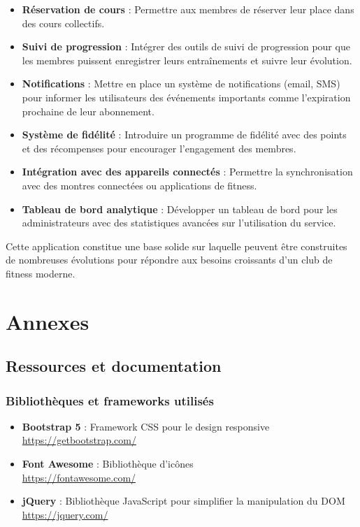 \documentclass[12pt,a4paper]{report}
\begin{document}
\begin{itemize}
    \item \textbf{Réservation de cours} : Permettre aux membres de réserver leur place dans des cours collectifs.
    
    \item \textbf{Suivi de progression} : Intégrer des outils de suivi de progression pour que les membres puissent enregistrer leurs entraînements et suivre leur évolution.
    
    \item \textbf{Notifications} : Mettre en place un système de notifications (email, SMS) pour informer les utilisateurs des événements importants comme l'expiration prochaine de leur abonnement.
    
    \item \textbf{Système de fidélité} : Introduire un programme de fidélité avec des points et des récompenses pour encourager l'engagement des membres.
    
    \item \textbf{Intégration avec des appareils connectés} : Permettre la synchronisation avec des montres connectées ou applications de fitness.
    
    \item \textbf{Tableau de bord analytique} : Développer un tableau de bord pour les administrateurs avec des statistiques avancées sur l'utilisation du service.
\end{itemize}

Cette application constitue une base solide sur laquelle peuvent être construites de nombreuses évolutions pour répondre aux besoins croissants d'un club de fitness moderne.

\chapter{Annexes}

\section{Ressources et documentation}

\subsection{Bibliothèques et frameworks utilisés}
\begin{itemize}
    \item \textbf{Bootstrap 5} : Framework CSS pour le design responsive\\
    \url{https://getbootstrap.com/}
    
    \item \textbf{Font Awesome} : Bibliothèque d'icônes\\
    \url{https://fontawesome.com/}
    
    \item \textbf{jQuery} : Bibliothèque JavaScript pour simplifier la manipulation du DOM\\
    \url{https://jquery.com/}
\end{itemize}
\end{document}
